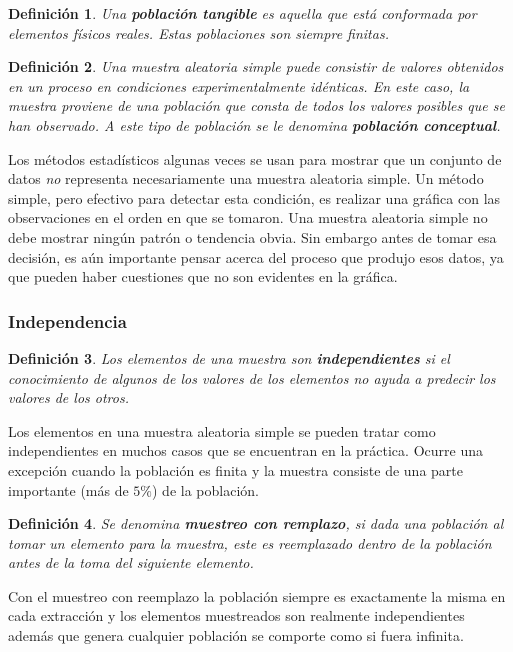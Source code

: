 \documentclass[10pt,a4paper]{book}
\newtheorem{defi}{\textbf{Definición}}
\begin{document}
\begin{defi}
	Una \textbf{población tangible} es aquella que está conformada por elementos físicos reales. Estas poblaciones son siempre finitas.
\end{defi}

\begin{defi}
	Una muestra aleatoria simple puede consistir de valores obtenidos en un proceso en condiciones experimentalmente idénticas. En este caso, la muestra proviene de una población que consta de todos los valores posibles que se han observado. A este tipo de población se le denomina \textbf{población conceptual}.
\end{defi}

Los métodos estadísticos algunas veces se usan para mostrar que un conjunto de datos \textit{no} representa necesariamente una muestra aleatoria simple. Un método simple, pero efectivo para detectar esta condición, es realizar una gráfica con las observaciones en el orden en que se tomaron. Una muestra aleatoria simple no debe mostrar ningún patrón o tendencia obvia. Sin embargo antes de tomar esa decisión, es aún importante pensar acerca del proceso que produjo esos datos, ya que pueden haber cuestiones que no son evidentes en la gráfica.\\

\subsubsection{Independencia}

\begin{defi}
	Los elementos de una muestra son \textbf{independientes} si el conocimiento de algunos de los valores de los elementos no ayuda a predecir los valores de los otros.
\end{defi}

Los elementos en una muestra aleatoria simple se pueden tratar como independientes en muchos casos que se encuentran en la práctica. Ocurre una excepción cuando la población es finita y la muestra consiste de una parte importante (más de $ 5\% $) de la población.\\

\begin{defi}
	Se denomina \textbf{muestreo con remplazo}, si dada una población al tomar un elemento para la muestra, este es reemplazado dentro de la población antes de la toma del siguiente elemento.
\end{defi}

Con el muestreo con reemplazo la población siempre es exactamente la misma en cada extracción y los elementos muestreados son realmente independientes además que genera cualquier población se comporte como si fuera infinita.\\
\end{document}
